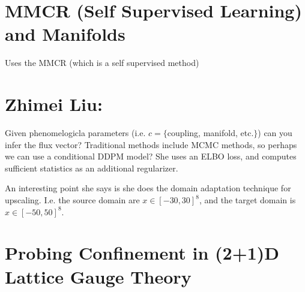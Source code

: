 \section{MMCR (Self Supervised Learning) and Manifolds}
Uses the MMCR (which is a self supervised method)

\section{Zhimei Liu: }
Given phenomelogicla parameters (i.e. $c = \{$coupling, manifold, etc.$\}$) can you infer the flux vector? Traditional methods include MCMC methods, so perhaps we can use a conditional DDPM model? She uses an ELBO loss, and computes sufficient statistics as an additional regularizer.

An interesting point she says is she does the domain adaptation technique for upscaling. I.e. the source domain are $x \in [-30, 30]^8$, and the target domain is $x \in [-50, 50]^8$.


\section{Probing Confinement in (2+1)D Lattice Gauge Theory}
